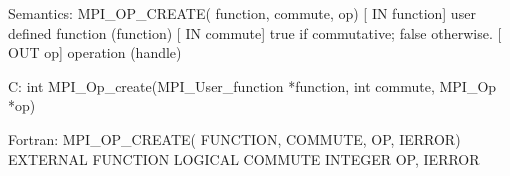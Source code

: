 Semantics:
MPI_OP_CREATE( function, commute, op)
[ IN function] user defined function (function)
[ IN commute] true if commutative; false otherwise.
[ OUT op] operation (handle)

C:
int MPI_Op_create(MPI_User_function *function, int commute,
    MPI_Op *op)

Fortran:
MPI_OP_CREATE( FUNCTION, COMMUTE, OP, IERROR)
EXTERNAL FUNCTION
LOGICAL COMMUTE
INTEGER OP, IERROR
